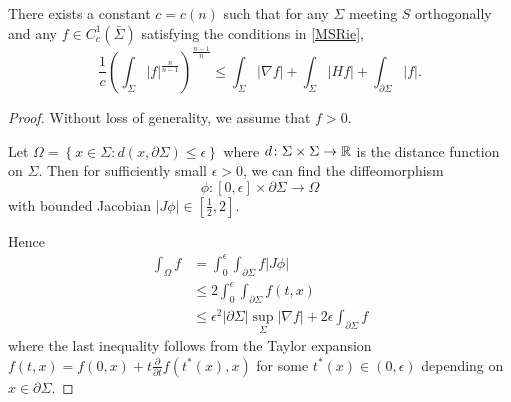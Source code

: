 \begin{theorem} \label{MSwithextra}
    There exists a constant $c=c(n)$ such that for any $\Sigma $ meeting $S$ orthogonally and any $f \in C_{c}^{1}(\bar{\Sigma})$ satisfying the conditions in \autoref{MSRie},
    \[\frac{1}{c}(\int_{\Sigma} \left| f \right| ^{\frac{n}{n-1}})^{\frac{n-1}{n}}\leq \int_{\Sigma} \left| \nabla f \right| +\int_{\Sigma} \left| Hf \right| +\int_{\partial \Sigma} \left| f \right| .\]
\end{theorem}

\begin{proof}
    Without loss of generality, we assume that $f>0$.
    
    Let $\Omega=\left\{ x \in \Sigma : d(x,\partial \Sigma ) \leq \epsilon \right\}$ where $d\colon\Sigma \times \Sigma \to \mathbb{R}$ is the distance function on $\Sigma $. Then for sufficiently small $\epsilon >0$, we can find the diffeomorphism \[\phi \colon [0,\epsilon ] \times \partial \Sigma \to \Omega \] with bounded Jacobian $\left| J \phi  \right| \in [\frac{1}{2}, 2] $.
    
    Hence
    \begin{equation} \label{bdyest}
    \begin{split}
        \int_{\Omega }^{}f 
    &= \int_{0}^{\epsilon }\int_{\partial \Sigma} f \left| J \phi  \right|  \\
    & \leq 2 \int_{0}^{\epsilon }\int_{\partial \Sigma} f(t,x)  \\
    & \leq \epsilon ^2 \left| \partial \Sigma  \right| \sup _{\Sigma }\left| \nabla f \right| +2 \epsilon \int_{\partial \Sigma} f
    \end{split}
    \end{equation} 
    where the last inequality follows from the Taylor expansion $f(t,x)=f(0,x)+t \frac{\partial }{\partial t} f (t^*(x),x)$ for some $t^*(x) \in (0,\epsilon )$ depending on $x \in \partial \Sigma .$
    

\end{proof}
